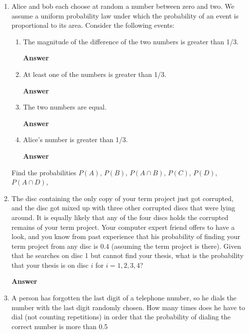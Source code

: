 \documentclass[paper=usletter, fontsize=12pt]{article}
\newcommand{\ans}{\textbf{Answer} \ }
\begin{document}
\begin{enumerate}
        \ans

        \item Alice and bob each choose at random a number between zero and
        two. We assume a uniform probability law under which the probability of
        an event is proportional to its area. Consider the following events:

            \begin{enumerate}

                \item The magnitude of the difference of the two numbers is
                greater than 1/3.

                \ans

                \item At least one of the numbers is greater than 1/3.

                \ans

                \item The two numbers are equal.

                \ans

                \item Alice's number is greater than 1/3.

                \ans

            \end{enumerate}

        Find the probabilities $P(A)$, $P(B)$, $P(A \cap B)$, $P(C)$, $P(D)$,
        $P(A \cap D)$,

        \item The disc containing the only copy of your term project just got
        corrupted, and the disc got mixed up with three other corrupted discs
        that were lying around. It is equally likely that any of the four discs
        holds the corrupted remains of your term project. Your computer expert
        friend offers to have a look, and you know from past experience that
        his probability of finding your term project from any disc is 0.4
        (assuming the term project is there). Given that he searches on disc 1
        but cannot find your thesis, what is the probability that your thesis
        is on disc $i$ for $i = 1, 2, 3, 4$?

        \ans

        \item A person has forgotten the last digit of a telephone number, so
        he dials the number with the last digit randomly chosen. How many times
        does he have to dial (not counting repetitions) in order that the
        probability of dialing the correct number is more than 0.5


\end{enumerate}
\end{document}
